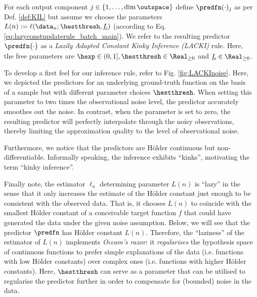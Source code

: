 \begin{defn} \label{def:LACKI} For each output component $j \in \{1,\ldots,\text{dim} \, \outspace \}$ 
define $\predfn(\cdot)_{j}$  as per Def. \ref{def:KIL} but assume we choose the parameters $L(n) := \ell(\data_n;\hestthresh,\underline L)$ (according to Eq. \ref{eq:lazyconstupdaterule_batch_main}). We refer to the resulting predictor $\predfn\bigl(\cdot \bigr)$ as a \emph{Lazily Adapted Constant Kinky Inference (LACKI)} rule. Here, the free parameters are $\hexp \in (0,1], \hestthresh \in \Real_{\geq 0}$ and $\underline L \in \Real_{\geq 0}$.  
\end{defn}

To develop a first feel for our inference rule, refer to Fig. \ref{fig:LACKInoise}. Here, we depicted the predictors for an underlying ground-truth function on the basis of a sample but with different parameter choices $\hestthresh$. When setting this parameter to two times the observational noise level, the predictor accurately smoothes out the noise. In contrast, when the parameter is set to zero, the resulting predictor will perfectly interpolate through the noisy observations, thereby limiting the approximation quality to the level of observational noise. 

Furthermore, we notice that the predictors are H\"older continuous but non-differentiable. Informally speaking, the inference exhibits ``kinks'', motivating the term ``kinky inference''.

Finally note, the estimator $\ell_n$ determining  parameter $L(n)$ is ``lazy'' in the sense that it only increases the estimate of the H\"older constant just enough to be consistent with the observed data. That is, it chooses $L(n)$ to coincide with the smallest H\"older constant of a conceivable target function $f$ that could have generated the data under the given noise assumption. Below, we will see that the predictor $\predfn$ has H\"older constant $L(n)$. Therefore, the ``laziness'' of the estimator of $L(n)$ implements \emph{Occam's razor}: it \emph{regularises} the hypothesis space of continuous functions to prefer simple explanations of the data (i.e. functions with low H\"older constants) over complex ones (i.e. functions with higher H\"older constants). Here, $\hestthresh$ can serve as a parameter that can be utilised to regularise the predictor further in order to compensate for (bounded) noise in the data. 



